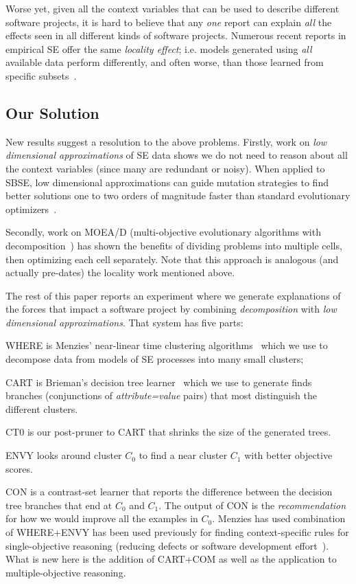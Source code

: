 Worse yet, given all the context variables that can
be used to describe different software projects, it
is hard to believe that any {\em one} report can
explain {\em all} the effects seen in all different
kinds of software projects. Numerous recent reports
in empirical SE offer the same {\em locality
effect}; i.e. models generated using {\em all}
available data perform differently, and often worse, than
those learned from specific subsets~\cite{posnet11,betta12,me12d,yang13,emse12}.

\subsection{Our Solution}

New results suggest a resolution to the above
problems.  Firstly, work on {\em low dimensional
  approximations} of SE data shows we do not
need to reason about all the context variables
(since many are redundant or noisy). When applied to
SBSE, low dimensional approximations can
guide mutation strategies to find
better solutions one to two orders of magnitude
faster than standard evolutionary
optimizers~\cite{krall14,krall14b}.

Secondly, work on MOEA/D (multi-objective
evolutionary algorithms with decomposition~\cite{zhang07:TEC}) has
shown the benefits of dividing  problems into multiple cells, then 
optimizing each cell separately.  Note
that this approach is analogous (and actually
pre-dates) the locality work mentioned above.

The rest of this paper reports an experiment where we generate explanations
of the forces that impact a software project by combining
{\em decomposition} with {\em low dimensional approximations}. That system
has five parts:
\be
\item
WHERE is Menzies'  near-linear time clustering algorithms~\cite{me12d}  which we use to
decompose
data from models of SE processes into many small clusters;
\item 
CART is Brieman's decision tree learner~\cite{breiman84} which we use
to generate finds branches (conjunctions of {\em
  attribute=value} pairs) that most distinguish the
different clusters.
\item
CT0 is our post-pruner to CART that shrinks the size of the generated trees.
\item 
ENVY looks around cluster $C_0$ to  find a near cluster $C_1$  
with better objective scores.
\item
CON is a  contrast-set learner that reports the difference between the
decision tree branches that end at $C_0$ and $C_1$. 
The output of CON is the {\em recommendation} for how we would improve all the examples in $C_0$.
\ee
Menzies has used combination of WHERE+ENVY has been used previously for finding context-specific
rules for single-objective reasoning (reducing defects or software development effort~\cite{me12d}).
What is new here is the addition of CART+COM as well as the application to multiple-objective reasoning.

